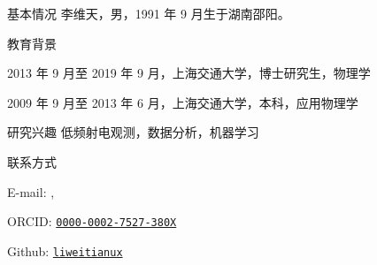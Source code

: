 
\begin{resume}
  \begin{resumesection}{基本情况}
    李维天，男，1991 年 9 月生于湖南邵阳。
  \end{resumesection}

  \begin{resumelist}{教育背景}
    \item 2013 年 9 月至 2019 年 9 月，上海交通大学，博士研究生，物理学
    \item 2009 年 9 月至 2013 年 6 月，上海交通大学，本科，应用物理学
  \end{resumelist}

  \begin{resumesection}{研究兴趣}
    低频射电观测，数据分析，机器学习
  \end{resumesection}

  \begin{resumelist}{联系方式}
    \item E-mail:
      , \hspace{0.5em}
    \item ORCID:
      \href{https://orcid.org/0000-0002-7527-380X}{\texttt{0000-0002-7527-380X}}
    \item Github:
      \href{https://github.com/liweitianux}{\texttt{liweitianux}}
  \end{resumelist}
\end{resume}
